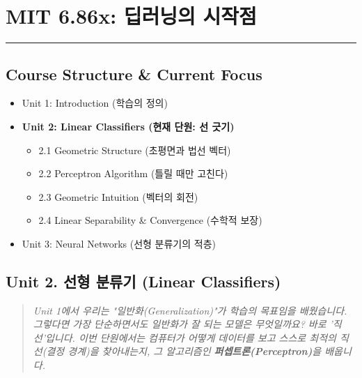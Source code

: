 \documentclass[11pt,a4paper]{book}
\theoremstyle{definition}
\begin{document}
\chapter{MIT 6.86x: 딥러닝의 시작점}
\label{ch:lecture2}


\vspace{1cm}
\hrule
\vspace{1cm}

\section*{Course Structure \& Current Focus}
\begin{itemize}
    \item Unit 1: Introduction (학습의 정의)
    \item \textbf{\textcolor{mainblue}{Unit 2: Linear Classifiers (현재 단원: 선 긋기)}}
    \begin{itemize}
        \item 2.1 Geometric Structure (초평면과 법선 벡터)
        \item 2.2 Perceptron Algorithm (틀릴 때만 고친다)
        \item 2.3 Geometric Intuition (벡터의 회전)
        \item 2.4 Linear Separability \& Convergence (수학적 보장)
    \end{itemize}
    \item Unit 3: Neural Networks (선형 분류기의 적층)
\end{itemize}


\section{Unit 2. 선형 분류기 (Linear Classifiers)}

\begin{quote}
\textit{Unit 1에서 우리는 "일반화(Generalization)"가 학습의 목표임을 배웠습니다. 그렇다면 가장 단순하면서도 일반화가 잘 되는 모델은 무엇일까요? 바로 '직선'입니다. 이번 단원에서는 컴퓨터가 어떻게 데이터를 보고 스스로 최적의 직선(결정 경계)을 찾아내는지, 그 알고리즘인 \textbf{퍼셉트론(Perceptron)}을 배웁니다.}
\end{quote}

\end{document}
